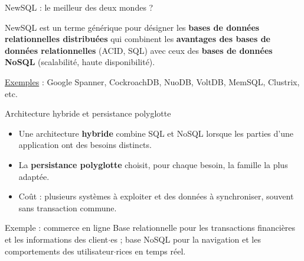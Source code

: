 \begin{frame}{NewSQL : le meilleur des deux mondes ?}

    NewSQL est un terme générique pour désigner les \textbf{bases de données
    relationnelles distribuées} qui combinent les \textbf{avantages des bases de
    données relationnelles} (ACID, SQL) avec ceux des \textbf{bases de données
    NoSQL} (scalabilité, haute disponibilité).

    \vspace{0.8cm}

    \underline{Exemples} : Google Spanner, CockroachDB, NuoDB, VoltDB, MemSQL,
    Clustrix, etc.


\end{frame}

\begin{frame}{Architecture hybride et persistance polyglotte}
    \begin{itemize}
        \item Une architecture \textbf{hybride} combine SQL et NoSQL lorsque les
              parties d'une application ont des besoins distincts.
        \item La \textbf{persistance polyglotte} choisit, pour chaque besoin, la
              famille la plus adaptée.
        \item Coût : plusieurs systèmes à exploiter et des données à
              synchroniser, souvent sans transaction commune.
    \end{itemize}

    \begin{examplebox}{Exemple : commerce en ligne}
        Base relationnelle pour les transactions financières et les informations
        des client$\cdot$es ; base NoSQL pour la navigation et les comportements
        des utilisateur$\cdot$rices en temps réel.
    \end{examplebox}
\end{frame}
